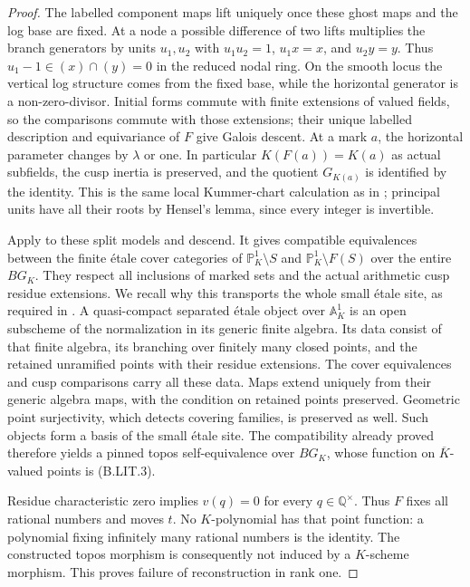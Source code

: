 \begin{proof}
The labelled component maps lift uniquely once these ghost maps
and the log base are fixed. At a node a possible difference of
two lifts multiplies the branch generators by units $u_1,u_2$
with $u_1u_2=1$, $u_1x=x$, and $u_2y=y$. Thus
$u_1-1\in(x)\cap(y)=0$ in the reduced nodal ring. On the
smooth locus the vertical log structure comes from the fixed
base, while the horizontal generator is a non-zero-divisor.
Initial forms commute with finite extensions of valued fields,
so the comparisons commute with those extensions; their unique
labelled description and equivariance of $F$ give Galois descent.
At a mark $a$, the horizontal parameter changes by $\lambda$
or one. In particular $K(F(a))=K(a)$ as actual subfields,
the cusp inertia is preserved, and the quotient $G_{K(a)}$ is
identified by the identity. This is the same local Kummer-chart
calculation as in ; principal units have all
their roots by Hensel's lemma, since every integer is invertible.

Apply  to these split models and descend.
It gives compatible equivalences between the finite \'etale
cover categories of $\mathbb P^1_K\setminus S$ and
$\mathbb P^1_K\setminus F(S)$ over the entire $BG_K$.
They respect all inclusions of marked sets and the actual
arithmetic cusp residue extensions. We recall why this transports
the whole small \'etale site, as required in
. A quasi-compact separated \'etale object
over $\mathbb A^1_K$ is an open subscheme of the normalization
in its generic finite algebra. Its data consist of that finite
algebra, its branching over finitely many closed points, and the
retained unramified points with their residue extensions.
The cover equivalences and cusp comparisons carry all these
data. Maps extend uniquely from their generic algebra maps,
with the condition on retained points preserved. Geometric
point surjectivity, which detects covering families, is preserved
as well. Such objects form a basis of the small \'etale site.
The compatibility already proved therefore yields a pinned
topos self-equivalence over $BG_K$, whose function on
$\overline K$-valued points is (B.LIT.3).

Residue characteristic zero implies $v(q)=0$ for every
$q\in\mathbb Q^\times$. Thus $F$ fixes all rational numbers
and moves $t$. No $K$-polynomial has that point function: a
polynomial fixing infinitely many rational numbers is the
identity. The constructed topos morphism is consequently not
induced by a $K$-scheme morphism. This proves failure of
reconstruction in rank one.


\end{proof}
